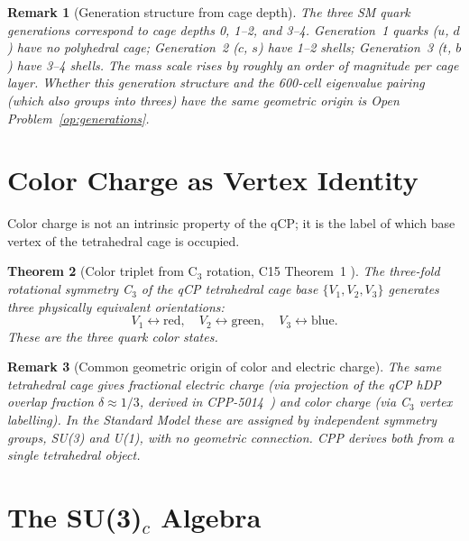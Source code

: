 \documentclass[11pt,letterpaper]{article}
\newtheorem{theorem}{Theorem}[section]
\newtheorem{remark}[theorem]{Remark}
\begin{document}
\begin{remark}[Generation structure from cage depth]
The three SM quark generations correspond to cage depths 0, 1--2,
and 3--4.  Generation~1 quarks ($u$, $d$) have no polyhedral cage;
Generation~2 ($c$, $s$) have 1--2 shells; Generation~3 ($t$, $b$)
have 3--4 shells.  The mass scale rises by roughly an order of
magnitude per cage layer.  Whether this generation structure and the
600-cell eigenvalue pairing (which also groups into threes) have
the same geometric origin is Open Problem~\ref{op:generations}.
\end{remark}

\section{Color Charge as Vertex Identity}
\label{sec:color}

Color charge is not an intrinsic property of the qCP; it is the
label of which base vertex of the tetrahedral cage is occupied.

\begin{theorem}[Color triplet from C$_3$ rotation, C15 Theorem~1 \citep{c15}]
\label{thm:color_triplet}
The three-fold rotational symmetry C$_3$ of the qCP tetrahedral
cage base $\{V_1, V_2, V_3\}$ generates three physically equivalent
orientations:
\begin{equation}
V_1 \leftrightarrow \text{red},\quad
V_2 \leftrightarrow \text{green},\quad
V_3 \leftrightarrow \text{blue}.
\label{eq:color_assign}
\end{equation}
These are the three quark color states.
\end{theorem}

\begin{remark}[Common geometric origin of color and electric charge]
The same tetrahedral cage gives fractional electric charge (via
projection of the qCP hDP overlap fraction $\delta \approx 1/3$,
derived in CPP-5014~\citep{cpp5014}) and color charge (via
C$_3$ vertex labelling).  In the Standard Model these are assigned
by independent symmetry groups, SU(3) and U(1), with no geometric
connection.  CPP derives both from a single tetrahedral object.
\end{remark}

\section{The SU(3)$_c$ Algebra}
\label{sec:su3}
\end{document}
